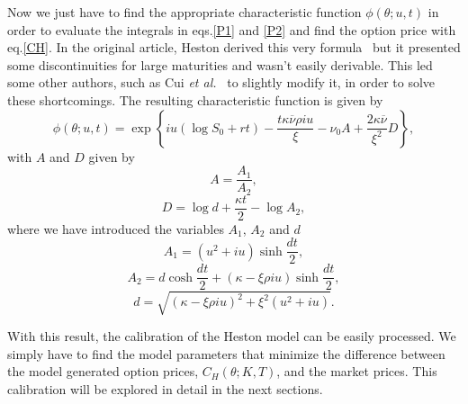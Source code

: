 Now we just have to find the appropriate characteristic function $\phi(\theta;u,t)$ in order to evaluate the integrals in eqs.\eqref{P1} and \eqref{P2} and find the option price with eq.\eqref{CH}. In the original article, Heston derived this very formula~\cite{Heston} but it presented some discontinuities for large maturities and wasn't easily derivable. This led some other authors, such as Cui \textit{et al.}~\citep{Cui} to slightly modify it, in order to solve these shortcomings. The resulting characteristic function is given by
\begin{equation}
\phi(\theta;u,t)=\exp\left\{iu\left(\log S_0+rt\right)-\frac{t\kappa\overline{\nu}\rho iu}{\xi}-\nu_0A+\frac{2\kappa\overline{\nu}}{\xi^2}D\right\},
\end{equation}
\noindent with $A$ and $D$ given by
\begin{equation}
A=\frac{A_1}{A_2},
\end{equation}
\begin{equation}
D=\log d+\frac{\kappa t}{2}-\log A_2,
\end{equation}
\noindent where we have introduced the variables $A_1$, $A_2$ and $d$ 
\begin{equation}
A_1=(u^2+iu)\sinh\frac{dt}{2},
\end{equation}
\begin{equation}
A_2=d\cosh\frac{dt}{2}+(\kappa -\xi\rho iu)\sinh\frac{dt}{2},
\end{equation}
\begin{equation}
d=\sqrt{(\kappa-\xi\rho iu)^2+\xi^2(u^2+iu)}.
\end{equation}

With this result, the calibration of the Heston model can be easily processed. We simply have to find the model parameters that minimize the difference between the model generated option prices, $C_H(\theta;K,T)$, and the market prices. This calibration will be explored in detail in the next sections.

\iffalse
Calibrating the parameters  $\rho$, $\kappa$, $\overline{\nu}$ and $\xi$ is absolutely critical. A model with badly calibrated parameters would output wrong predictions, rendering it completely useless.
This calibration requires a fair amount of past market data and is by far the most complex and computationally demanding section of this model. We will deal with it in the next section.
\fi






